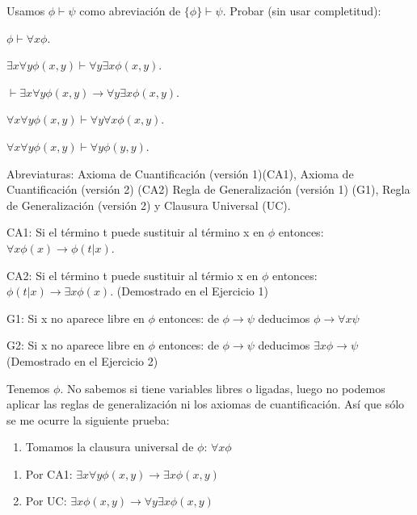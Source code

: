 \begin{problem}  Usamos $\phi \vdash \psi$ como abreviaci\'on de  $\{\phi\} \vdash \psi$.  Probar (sin usar completitud):

\ppart $ \phi  \vdash   \forall x \phi$.

\ppart  $\exists x \forall y \phi (x,y)  \vdash   \forall y \exists x \phi (x,y)$.

\ppart  $ \vdash  \exists x \forall y \phi (x,y)  \to \forall y \exists x \phi (x,y)$.

\ppart   $  \forall x \forall y \phi (x,y) \vdash   \forall y \forall x \phi (x,y)$.

\ppart   $  \forall x \forall y \phi (x,y) \vdash   \forall y \phi (y,y)$.

\solution

Abreviaturas: Axioma de Cuantificación (versión 1)(CA1), Axioma de Cuantificación (versión 2) (CA2) Regla de Generalización (versión 1) (G1), Regla de Generalización (versión 2) y  Clausura Universal (UC).


CA1: Si el término t puede sustituir al término x en $\phi$ entonces: $\forall x \phi(x) \to \phi(t|x)$.

CA2: Si el término t puede sustituir al térmio x en $\phi$ entonces: $\phi(t|x) \to \exists x \phi(x)$. (Demostrado en el Ejercicio 1)

G1: Si x no aparece libre en $\phi$ entonces: de $\phi \to \psi$ deducimos $\phi \to \forall x \psi$

G2: Si x no aparece libre en $\phi$ entonces: de $\phi \to \psi$ deducimos $\exists x \phi \to \psi$ (Demostrado en el Ejercicio 2)


\spart
Tenemos $\phi$. No sabemos si tiene variables libres o ligadas, luego no podemos aplicar las reglas de generalización ni los axiomas de cuantificación. Así que sólo se me ocurre la siguiente prueba:

\begin{enumerate}
	\item Tomamos la clausura universal de $\phi$: $\forall x \phi$
\end{enumerate}

\spart

\begin{enumerate}
\item Por CA1: $\exists x \forall y \phi (x,y) \to \exists x \phi (x,y)$
\item Por UC: $ \exists x \phi (x,y) \to \forall y \exists x \phi (x,y)$



\end{enumerate}
\end{problem}
